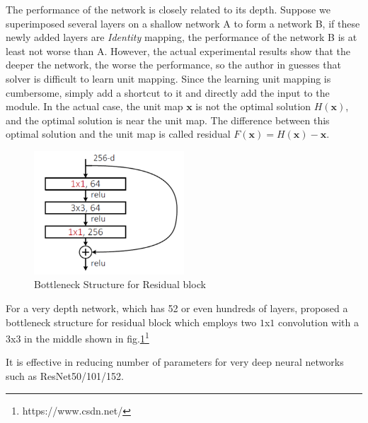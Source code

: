  The performance of the network is closely related to its depth. Suppose we superimposed several layers on a shallow network A to form a network B, if these newly added layers are \textit{Identity} mapping, the performance of the network B is at least not worse than A. However, the actual experimental results show that the deeper the network, the worse the performance\cite{He_2016_CVPR}, so the author in \cite{He_2016_CVPR} guesses that solver is difficult to learn unit mapping. Since the learning unit mapping is cumbersome, simply add a shortcut to it and directly add the input to the module. In the actual case, the unit map $\pmb{x}$ is not the optimal solution $H(\pmb{x})$, and the optimal solution is near the unit map. The difference between this optimal solution and the unit map is called residual $F(\pmb{x}) = H(\pmb{x}) - \pmb{x}$.\par
 \begin{figure}[h!]
    \centering
    \includegraphics[width=0.5\textwidth]{Chapters/Fig/bottle_neck_residual.PNG}
    \caption{Bottleneck Structure for Residual block}
    \label{fig:b_res}
\end{figure}
 For a very depth network, which has 52 or even hundreds of layers, \cite{He_2016_CVPR} proposed a bottleneck structure for residual block which employs two $1$x$1$ convolution with a $3$x$3$ in the middle shown in fig.\ref{fig:b_res}\footnote{https://www.csdn.net/}

 \par It is effective in reducing number of parameters for very deep neural networks such as ResNet50/101/152.
